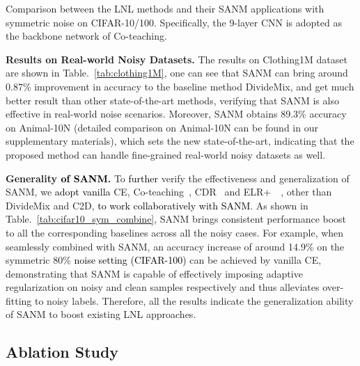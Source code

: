 \documentclass[10pt,twocolumn,letterpaper]{article}
\newcommand{\zbs}[1]{\textcolor{black}{#1}}
\begin{document}
 

\begin{table*}[!t]
\footnotesize
    \centering
    \caption{
    Comparison between the LNL methods and their SANM applications with symmetric noise on CIFAR-10/100. Specifically, the 9-layer CNN is adopted as the backbone network of Co-teaching.}
    \vspace{-1em}
    \setlength\tabcolsep{10pt}
    \resizebox{0.76\textwidth}{!}{}
\label{tab:cifar10_sym_combine}
    \vspace{-4mm}
\end{table*}




 



 \textbf{Results on Real-world Noisy Datasets.} 
The results on Clothing1M dataset are shown in Table.~\ref{tab:clothing1M}, one can see that SANM can bring around 0.87\% improvement in accuracy to the baseline method DivideMix, and get much better result than other state-of-the-art methods, verifying that SANM is also effective in real-world noise scenarios. 
Moreover, SANM obtains 89.3\% accuracy on Animal-10N (detailed comparison on Animal-10N can be found in our supplementary materials), which sets the new state-of-the-art, indicating that the proposed method can handle fine-grained real-world noisy datasets as well. 


\textbf{Generality \zbs{of SANM}.} 
To \zbs{further} verify the effectiveness and generalization of SANM, we \zbs{adopt vanilla} CE, Co-teaching~\cite{Co-han2018co}, CDR~\cite{2021CDR} and ELR+~~\cite{2020ELR}, other than DivideMix and C2D, \zbs{to work collaboratively with SANM}. As shown in Table.~\ref{tab:cifar10_sym_combine}, SANM brings consistent performance boost to all the corresponding baselines across all the noisy cases. For example, when seamlessly combined with SANM, an accuracy increase of around 14.9\% on the symmetric 80\% \zbs{noise setting (CIFAR-100)} can be achieved by vanilla CE, demonstrating that SANM is capable of effectively imposing adaptive regularization on noisy and clean samples respectively and thus alleviates over-fitting to noisy labels. Therefore, all the results indicate the generalization ability of SANM to boost existing LNL approaches. 

\vspace{-2mm}
\subsection{Ablation Study}
\end{document}
